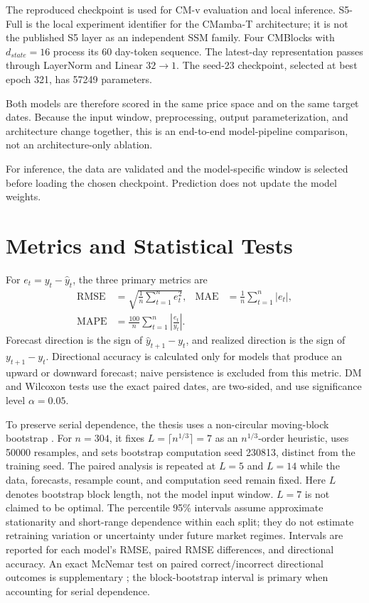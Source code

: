 \documentclass[13pt,a4paper,oneside]{report}
\begin{document}
The reproduced checkpoint is used for CM-v evaluation and local inference. S5-Full is the local
experiment identifier for the CMamba-T architecture; it is not the published S5 layer as an
independent SSM family. Four CMBlocks with $d_{state}=16$ process its 60 day-token sequence. The
latest-day representation passes through LayerNorm and Linear $32\to1$. The seed-23 checkpoint,
selected at best epoch 321, has \num{57249} parameters.

Both models are therefore scored in the same price space and on the same target dates. Because the
input window, preprocessing, output parameterization, and architecture change together, this is an
end-to-end model-pipeline comparison, not an architecture-only ablation.

For inference, the data are validated and the model-specific window is selected before loading the
chosen checkpoint. Prediction does not update the model weights.

\section{Metrics and Statistical Tests}\label{sec:metrics}
For $e_t=y_t-\widehat{y}_t$, the three primary metrics are
\begin{align}
\mathrm{RMSE} &= \sqrt{\frac{1}{n}\sum_{t=1}^{n}e_t^2}, &
\mathrm{MAE} &= \frac{1}{n}\sum_{t=1}^{n}|e_t|, \\
\mathrm{MAPE} &= \frac{100}{n}\sum_{t=1}^{n}\left|\frac{e_t}{y_t}\right|.
\end{align}
Forecast direction is the sign of $\widehat{y}_{t+1}-y_t$, and realized direction is the sign of
$y_{t+1}-y_t$. Directional accuracy is calculated only for models that produce an upward or
downward forecast; naive persistence is excluded from this metric. DM and Wilcoxon tests use the
exact paired dates, are two-sided, and use significance level $\alpha=0.05$.

To preserve serial dependence, the thesis uses a non-circular moving-block bootstrap
\cite{kunsch1989,buhlmann1999}. For $n=304$, it fixes
$L=\lceil n^{1/3}\rceil=\num{7}$ as an $n^{1/3}$-order heuristic, uses \num{50000} resamples, and
sets bootstrap computation seed \num{230813}, distinct from the training seed. The paired analysis
is repeated at $L=\num{5}$ and $L=\num{14}$ while the data, forecasts, resample count, and
computation seed remain fixed. Here $L$ denotes bootstrap block length, not the model input window.
$L=\num{7}$ is not claimed to be optimal. The percentile 95\%
intervals assume approximate stationarity and short-range dependence within each split; they do
not estimate retraining variation or uncertainty under future market regimes. Intervals are
reported for each model's RMSE, paired RMSE differences, and directional accuracy. An exact
McNemar test on paired correct/incorrect directional outcomes is supplementary
\cite{mcnemar1947}; the block-bootstrap interval is primary when accounting for serial dependence.
\end{document}
